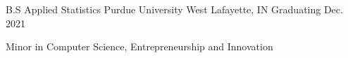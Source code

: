 
\begin{cventries}
  \edcventry
    {B.S Applied Statistics} %
    {Purdue University} %
    {West Lafayette, IN} %
    {Graduating Dec. 2021} %
    {
      \begin{cvitems} %
         \item {Minor in Computer Science, Entrepreneurship and Innovation}
      \end{cvitems}
    }
    
\end{cventries}
